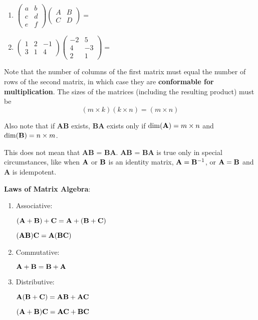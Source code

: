 \documentclass[]{book}
\theoremstyle{definition}
\theoremstyle{definition}
\theoremstyle{definition}
\theoremstyle{remark}
\begin{document}
\begin{enumerate}
        \item $\begin{pmatrix} a&b\\c&d\\e&f \end{pmatrix} \begin{pmatrix} A&B\\C&D \end{pmatrix}
            = \phantom{\begin{pmatrix} aA+bC&aB+bD\\cA+dC&cB+dD\\eA+fC&eB+fD \end{pmatrix}}$ 
        
        \item $\begin{pmatrix} 1&2&-1\\3&1&4 \end{pmatrix} \begin{pmatrix} -2&5\\4&-3\\2&1\end{pmatrix} = 
            \phantom{\begin{pmatrix} 1(-2)+2(4)-1(2)&1(5)+2(-3)-1(1)\\
                3(-2)+1(4)+4(2)&3(5)+1(-3)+4(1)\end{pmatrix} =
            \begin{pmatrix} 4&-2\\6&16\end{pmatrix}}$
    \end{enumerate}

Note that the number of columns of the first matrix must equal the
number of rows of the second matrix, in which case they are
\textbf{conformable for multiplication}. The sizes of the matrices
(including the resulting product) must be
\[(m\times k)(k\times n)=(m\times n)\]

Also note that if \textbf{AB} exists, \textbf{BA} exists only if
\(\dim({\bf A}) = m \times n\) and \(\dim({\bf B}) = n \times m\).

This does not mean that \textbf{AB} = \textbf{BA}. \textbf{AB} =
\textbf{BA} is true only in special circumstances, like when \({\bf A}\)
or \({\bf B}\) is an identity matrix, \({\bf A} = {\bf B}^{-1}\), or
\({\bf A} = {\bf B}\) and \textbf{A} is idempotent.

\textbf{Laws of Matrix Algebra}:

\begin{enumerate}
        \item \parbox[t]{1.5in}{Associative:} $\bf (A+B)+C = A+(B+C)$\\
            \parbox[t]{1.5in}{\quad}  $\bf (AB)C = A(BC)$
        \item \parbox[t]{1.5in}{Commutative:} $\bf A+B=B+A$
        \item \parbox[t]{1.5in}{Distributive:} $\bf A(B+C)=AB+AC$\\
            \parbox[t]{1.5in}{\quad}   $\bf (A+B)C=AC+BC$
\end{enumerate}
\end{document}
